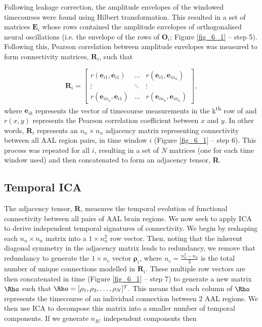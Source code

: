 Following leakage correction, the amplitude envelopes of the windowed timecourses were found using Hilbert transformation. This resulted in a set of matrices $\mathbf{E}_i$ whose rows contained the amplitude envelopes of orthogonalised neural oscillations (i.e. the envelope of the rows of $\mathbf{O}_i$; Figure \ref{fig_6_1} – step 5).  Following this, Pearson correlation between amplitude envelopes was measured to form connectivity matrices, $\mathbf{R}_i$, such that

\begin{equation}
\mathbf{R}_i = 
	 \begin{bmatrix}
		r(\mathbf{e}_{i1},\mathbf{e}_{i1}) & \hdots & r(\mathbf{e}_{i1},\mathbf{e}_{in_n}) \\
		\vdots & \ddots & \vdots \\
		r(\mathbf{e}_{in_n},\mathbf{e}_{i1}) & \hdots & r(\mathbf{e}_{in_n},\mathbf{e}_{in_n})
	\end{bmatrix},
\end{equation} where $\mathbf{e}_{ik}$ represents the vector of timecourse measurements in the k\textsuperscript{th} row of  and $r(x,y)$ represents the Pearson correlation coefficient between $x$ and $y$. In other words, $\mathbf{R}_i$ represents an $n_n \times n_n$ adjacency matrix representing connectivity between all AAL region pairs, in time window $i$ (Figure \ref{fig_6_1} – step 6). This process was repeated for all $i$, resulting in a set of $N$ matrices (one for each time window used) and then concatenated to form an adjacency tensor, \textbf{R}.

\subsection{Temporal ICA}
The adjacency tensor, \textbf{R}, measures the temporal evolution of functional connectivity between all pairs of AAL brain regions. We now seek to apply ICA to derive independent temporal signatures of connectivity. We begin by reshaping each $n_n \times n_n$ matrix into a $1\times n_n^2$ row vector. Then, noting that the inherent diagonal symmetry in the adjacency matrix leads to redundancy, we remove that redundancy to generate the $1\times n_c$ vector $\mathbf{\rho}_i$, where $n_c = \frac{n_n^2-n_n}{2}$ is the total number of unique connections modelled in $\mathbf{R}_i$. These multiple row vectors are then concatenated in time (Figure \ref{fig_6_1} – step 7) to generate a new matrix $\mathbf{\Rho}$ such that $\mathbf{\Rho} = [ \mathbf{\rho}_1 , \mathbf{\rho}_2 , \hdots , \mathbf{\rho}_N]^T$. This means that each column of $\mathbf{\Rho}$ represents the timecourse of an individual connection between 2 AAL regions. We then use ICA to decompose this matrix into a smaller number of temporal components. If we generate $n_{IC}$ independent components then

